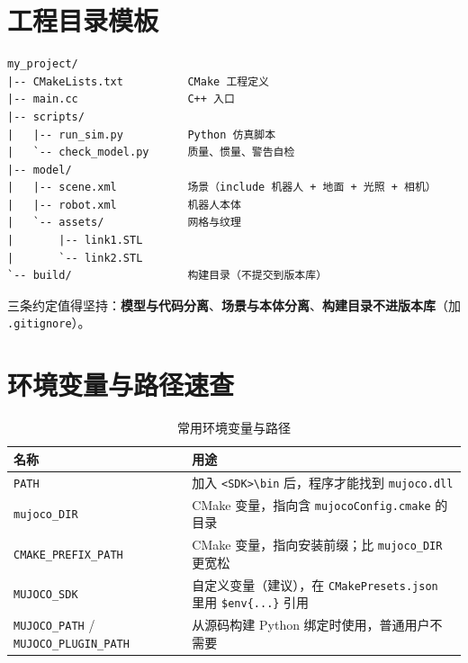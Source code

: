 
\section{工程目录模板}

\begin{lstlisting}[style=code]
my_project/
|-- CMakeLists.txt          CMake 工程定义
|-- main.cc                 C++ 入口
|-- scripts/
|   |-- run_sim.py          Python 仿真脚本
|   `-- check_model.py      质量、惯量、警告自检
|-- model/
|   |-- scene.xml           场景（include 机器人 + 地面 + 光照 + 相机）
|   |-- robot.xml           机器人本体
|   `-- assets/             网格与纹理
|       |-- link1.STL
|       `-- link2.STL
`-- build/                  构建目录（不提交到版本库）
\end{lstlisting}

三条约定值得坚持：\textbf{模型与代码分离}、\textbf{场景与本体分离}、\textbf{构建目录不进版本库}（加 \texttt{.gitignore}）。

\section{环境变量与路径速查}

\begin{table}[H]
	\centering
	\caption{常用环境变量与路径}
	\label{tab:App:环境变量}
	\footnotesize
	\begin{tabular}{>{\raggedright\arraybackslash}p{4.6cm}>{\raggedright\arraybackslash}p{9.6cm}}
		\hline
		名称 & 用途 \\
		\hline
		\texttt{PATH} & 加入 \texttt{<SDK>\textbackslash{}bin} 后，程序才能找到 \texttt{mujoco.dll} \\
		\texttt{mujoco\_DIR} & CMake 变量，指向含 \texttt{mujocoConfig.cmake} 的目录 \\
		\texttt{CMAKE\_PREFIX\_PATH} & CMake 变量，指向安装前缀；比 \texttt{mujoco\_DIR} 更宽松 \\
		\texttt{MUJOCO\_SDK} & 自定义变量（建议），在 \texttt{CMakePresets.json} 里用 \texttt{\$env\{...\}} 引用 \\
		\texttt{MUJOCO\_PATH} / \texttt{MUJOCO\_PLUGIN\_PATH} & 从源码构建 Python 绑定时使用，普通用户不需要 \\
		\hline
	\end{tabular}
\end{table}

